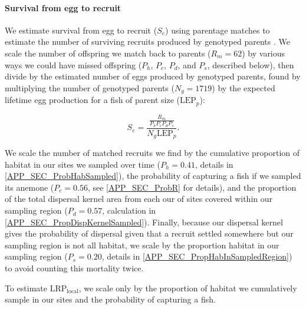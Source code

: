 \documentclass[12pt, oneside]{article}   	%
\begin{document}

\paragraph*{Survival from egg to recruit}

We estimate survival from egg to recruit ($S_e$) using parentage matches to estimate the number of surviving recruits produced by genotyped parents \citep[similar to the method in][]{johnson2018integrating}. We scale the number of offspring we match back to parents ($R_m = 62$) by various ways we could have missed offspring ($P_h$, $P_c$, $P_d$, and $P_s$, described below), then divide by the estimated number of eggs produced by genotyped parents, found by multiplying the number of genotyped parents ($N_g = 1719$) by the expected lifetime egg production for a fish of parent size ($\text{LEP}_p$):

\begin{equation}
S_e = \frac{\frac{R_m}{P_h P_c P_d P_s}}{N_g \text{LEP}_p}. \label{EQN_EggRecruitSurv}
\end{equation}

We scale the number of matched recruits we find by the cumulative proportion of habitat in our sites we sampled over time ($P_h = 0.41$, details in \ref{APP_SEC_ProbHabSampled}),
the probability of capturing a fish if we sampled its anemone ($P_c = 0.56$, see \ref{APP_SEC_ProbR} for details), and the proportion of the total dispersal kernel area from each our of sites covered within our sampling region ($P_d =0.57$, calculation in \ref{APP_SEC_PropDispKernelSampled}). Finally, because our dispersal kernel gives the probability of dispersal given that a recruit settled somewhere but our sampling region is not all habitat, we scale by the proportion habitat in our sampling region ($P_s = 0.20$, details in \ref{APP_SEC_PropHabInSampledRegion}) to avoid counting this mortality twice. 

To estimate $\text{LRP}_\text{local}$, we scale only by the proportion of habitat we cumulatively sample in our sites and the probability of capturing a fish.
\end{document}
